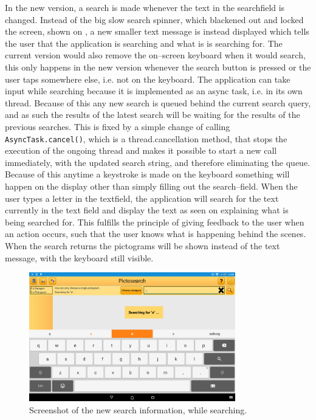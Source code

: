 In the new version, a search is made whenever the text in the searchfield is changed.
Instead of the big slow search spinner, which blackened out and locked the screen, shown on , a new smaller text message is instead displayed which tells the user that the application is searching and what is is searching for.
The current version would also remove the on--screen keyboard when it would search, this only happens in the new version whenever the search button is pressed or the user taps somewhere else, i.e. not on the keyboard.
The application can take input while searching because it is implemented as an async task, i.e. in its own thread.
Because of this any new search is queued behind the current search query, and as such the results of the latest search will be waiting for the results of the previous searches.
This is fixed by a simple change of calling \texttt{AsyncTask.cancel()}, which is a thread.cancellation method, that stops the execution of the ongoing thread and makes it possible to start a new call immediately, with the updated search string, and therefore eliminating the queue.
Because of this anytime a keystroke is made on the keyboard something will happen on the display other than simply filling out the search--field.
When the user types a letter in the textfield, the application will search for the text currently in the text field and display the text as seen on  explaining what is being searched for.
This fulfills the principle of giving feedback to the user when an action occurs, such that the user knows what is happening behind the scenes.
When the search returns the pictograms will be shown instead of the text message, with the keyboard still visible.

\begin{figure}[ht]
    \centering
    \includegraphics[width=0.8\textwidth]{figures/img/screenshots/new_dialog.png}
    \caption{Screenshot of the new search information, while searching.}\label{fig:screenshot_newsearch}
\end{figure}

